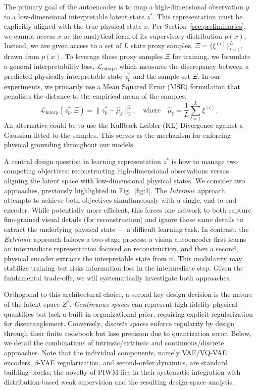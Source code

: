 \documentclass[nonacm,sigconf]{acmart}
\begin{document}
The primary goal of the autoencoder is to map a high-dimensional observation \(y\) to a low-dimensional interpretable latent state \(z^*\). This representation must be explicitly aligned with the true physical state \(x\). Per Section~\ref{sec:preliminaries}, we cannot access \(x\) or the analytical form of its supervisory distribution \(p(x)\). Instead, we are given access to a set of \(L\) state proxy samples, \(\Xi = \{\xi^{(l)}\}_{l=1}^L\), drawn from \(p(x)\). To leverage these proxy samples \(\Xi\) for training, we formulate a general {interpretability loss}, \(\mathcal{L}_{\text{interp}}\), which measures the discrepancy between a predicted physically interpretable state \(z_p^*\) and the sample set \(\Xi\). In our experiments, we primarily use a Mean Squared Error (MSE) formulation that penalizes the distance to the empirical mean of the samples:
\begin{equation}
\mathcal{L}_{\text{interp}}(z_p^*, \Xi) = \| z_p^* - \hat{\mu}_{\xi} \|_2^2, \quad \text{where} \quad \hat{\mu}_{\xi} = \frac{1}{L}\sum_{l=1}^L \xi^{(l)}.
\label{eq:interp_loss}
\end{equation}
An alternative could be to use the Kullback-Leibler (KL) Divergence against a Gaussian fitted to the samples. This serves as the mechanism for enforcing physical grounding throughout our models.


A central design question in learning representation \(z^*\) is how to manage two competing objectives: reconstructing high-dimensional observations versus aligning the latent space with low-dimensional physical states. We consider two approaches, previously highlighted in Fig.~\ref{fig:1}. The \emph{Intrinsic} approach attempts to achieve both objectives simultaneously with a single, end-to-end encoder. While potentially more efficient, this forces one network to both capture fine-grained visual details (for reconstruction) and ignore those same details to extract the underlying physical state --- a difficult learning task. In contrast, the \emph{Extrinsic} approach follows a two-stage process: a vision autoencoder first learns an intermediate representation focused on reconstruction, and then a second, physical encoder extracts the interpretable state from it. This modularity may stabilize training but risks information loss in the intermediate step. Given the fundamental trade-offs, we will systematically investigate both approaches.

Orthogonal to this architectural choice, a second key design decision is the nature of the latent space \(Z^*\). \emph{Continuous spaces} can represent high-fidelity physical quantities but lack a built-in organizational prior, requiring explicit regularization for disentanglement. Conversely, \emph{discrete spaces} enforce regularity by design through their finite codebook but lose precision due to quantization error.
Below, we detail the combinations of intrinsic/extrinsic and continuous/discrete approaches. Note that the individual components, namely VAE/VQ-VAE encoders, $\beta$-VAE regularization, and second-order dynamics, are standard building blocks; the novelty of PIWM lies in their systematic integration with distribution-based weak supervision and the resulting design-space analysis.
\end{document}
